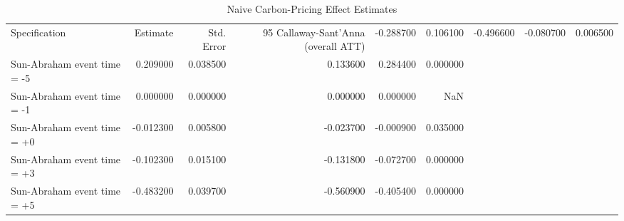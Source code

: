 \begin{table}
\caption{Naive Carbon-Pricing Effect Estimates}
\label{tab:naive_results}
\begin{tabular}{lrrrrr}
\toprule
Specification & Estimate & Std. Error & 95%
\midrule
Callaway-Sant'Anna (overall ATT) & -0.288700 & 0.106100 & -0.496600 & -0.080700 & 0.006500 \\
Sun-Abraham event time = -5 & 0.209000 & 0.038500 & 0.133600 & 0.284400 & 0.000000 \\
Sun-Abraham event time = -1 & 0.000000 & 0.000000 & 0.000000 & 0.000000 & NaN \\
Sun-Abraham event time = +0 & -0.012300 & 0.005800 & -0.023700 & -0.000900 & 0.035000 \\
Sun-Abraham event time = +3 & -0.102300 & 0.015100 & -0.131800 & -0.072700 & 0.000000 \\
Sun-Abraham event time = +5 & -0.483200 & 0.039700 & -0.560900 & -0.405400 & 0.000000 \\
\bottomrule
\end{tabular}
\end{table}
